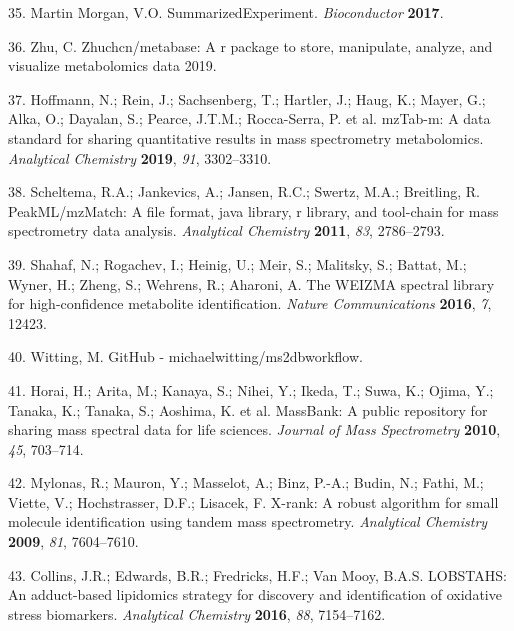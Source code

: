 \documentclass[]{article}
\begin{document}
\leavevmode\hypertarget{ref-martinmorgan_2017}{}%
35. Martin Morgan, V.O. SummarizedExperiment. \emph{Bioconductor} \textbf{2017}.

\leavevmode\hypertarget{ref-zhu_website_2019}{}%
36. Zhu, C. Zhuchcn/metabase: A r package to store, manipulate, analyze, and visualize metabolomics data 2019.

\leavevmode\hypertarget{ref-hoffmann_2019}{}%
37. Hoffmann, N.; Rein, J.; Sachsenberg, T.; Hartler, J.; Haug, K.; Mayer, G.; Alka, O.; Dayalan, S.; Pearce, J.T.M.; Rocca-Serra, P. et al. mzTab-m: A data standard for sharing quantitative results in mass spectrometry metabolomics. \emph{Analytical Chemistry} \textbf{2019}, \emph{91}, 3302--3310.

\leavevmode\hypertarget{ref-scheltema_2011}{}%
38. Scheltema, R.A.; Jankevics, A.; Jansen, R.C.; Swertz, M.A.; Breitling, R. PeakML/mzMatch: A file format, java library, r library, and tool-chain for mass spectrometry data analysis. \emph{Analytical Chemistry} \textbf{2011}, \emph{83}, 2786--2793.

\leavevmode\hypertarget{ref-shahaf_2016}{}%
39. Shahaf, N.; Rogachev, I.; Heinig, U.; Meir, S.; Malitsky, S.; Battat, M.; Wyner, H.; Zheng, S.; Wehrens, R.; Aharoni, A. The WEIZMA spectral library for high-confidence metabolite identification. \emph{Nature Communications} \textbf{2016}, \emph{7}, 12423.

\leavevmode\hypertarget{ref-witting_website_nd}{}%
40. Witting, M. GitHub - michaelwitting/ms2dbworkflow.

\leavevmode\hypertarget{ref-horai_2010}{}%
41. Horai, H.; Arita, M.; Kanaya, S.; Nihei, Y.; Ikeda, T.; Suwa, K.; Ojima, Y.; Tanaka, K.; Tanaka, S.; Aoshima, K. et al. MassBank: A public repository for sharing mass spectral data for life sciences. \emph{Journal of Mass Spectrometry} \textbf{2010}, \emph{45}, 703--714.

\leavevmode\hypertarget{ref-mylonas_2009}{}%
42. Mylonas, R.; Mauron, Y.; Masselot, A.; Binz, P.-A.; Budin, N.; Fathi, M.; Viette, V.; Hochstrasser, D.F.; Lisacek, F. X-rank: A robust algorithm for small molecule identification using tandem mass spectrometry. \emph{Analytical Chemistry} \textbf{2009}, \emph{81}, 7604--7610.

\leavevmode\hypertarget{ref-collins_2016}{}%
43. Collins, J.R.; Edwards, B.R.; Fredricks, H.F.; Van Mooy, B.A.S. LOBSTAHS: An adduct-based lipidomics strategy for discovery and identification of oxidative stress biomarkers. \emph{Analytical Chemistry} \textbf{2016}, \emph{88}, 7154--7162.
\end{document}
